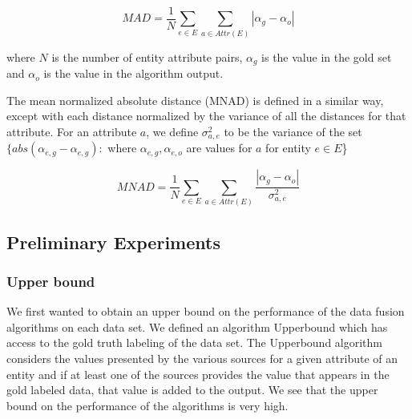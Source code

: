 \documentclass{acm_proc_article-sp}
\begin{document}
\begin{equation}
MAD = \frac{1}{N} \sum_{e \in E} \sum_{a \in Attr(E)} | \alpha_g - \alpha_o |
\end{equation}

where $N$ is the number of entity attribute pairs, $\alpha_g$ is the value in the gold set and $\alpha_o$ is the value in the algorithm output. 

The mean normalized absolute distance (MNAD) is defined in a similar way, except with each distance normalized by the variance of all the distances for that attribute. For an attribute $a$, we define $\sigma^2_{a,e}$ to be the variance of the set $\{ abs(\alpha_{e,g}-\alpha_{e,g})   :  $ where $\alpha_{e,g}, \alpha_{e,o}$ are values for  $a$ for entity $e \in E$\} 

\begin{equation}
MNAD = \frac{1}{N} \sum_{e \in E} \sum_{a \in Attr(E)} \frac{| \alpha_g - \alpha_o |}{\sigma^2_{a,e}}
\end{equation}


\newcommand{\headcol}{\rowcolor{tableheadcolor}} %



\subsection{Preliminary Experiments}

\subsubsection{Upper bound}

We first wanted to obtain an upper bound on the performance of the data fusion algorithms on each data set. We defined an algorithm {\sc Upperbound} which has access to the gold truth labeling of the data set. The {\sc Upperbound} algorithm considers the values presented by the various sources for a given attribute of an entity and if at least one of the sources provides the value that appears in the gold labeled data, that value is added to the output. We see that the upper bound on the performance of the algorithms is very high. 
\end{document}

